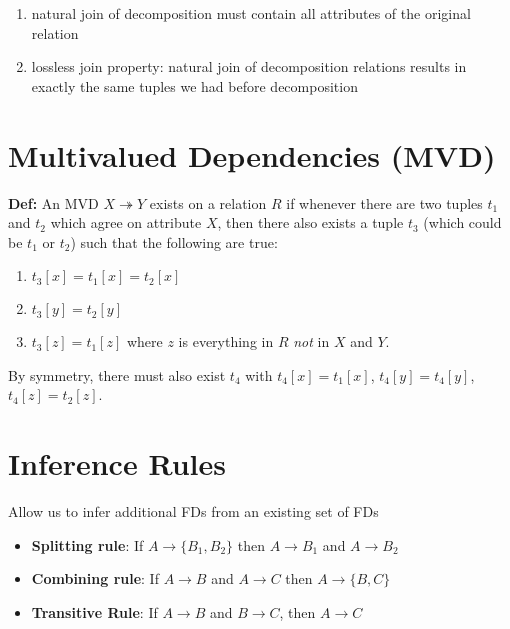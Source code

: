 \documentclass{../cheatsheet}
\begin{document}
\begin{multicols*}{2}
    \begin{enumerate}
        \item natural join of decomposition must contain all attributes of the
            original relation
        \item lossless join property: natural join of decomposition relations
            results in exactly the same tuples we had before decomposition
    \end{enumerate}

    \section{Multivalued Dependencies (MVD)}
    \textbf{Def:} An MVD $X \twoheadrightarrow Y$ exists on a relation $R$ if
    whenever there are two tuples $t_1$ and $t_2$ which agree on attribute $X$, then
    there also exists a tuple $t_3$ (which could be $t_1$ or $t_2$) such that the
    following are true:

    \begin{enumerate}
        \item $t_3[x] = t_1[x] = t_2[x]$
        \item $t_3[y] = t_2[y]$
        \item $t_3[z] = t_1[z]$ where $z$ is everything in $R$ \textit{not} in $X$
            and $Y$.
    \end{enumerate}

    By symmetry, there must also exist $t_4$ with $t_4[x] = t_1[x]$, $t_4[y] =
    t_4[y]$, $t_4[z] = t_2[z]$.

    \section{Inference Rules}
    Allow us to infer additional FDs from an existing set of FDs
    \begin{itemize}
        \item \textbf{Splitting rule}: If $A \rightarrow \{B_1, B_2\}$ then $A
            \rightarrow B_1$ and $A \rightarrow B_2$
        \item \textbf{Combining rule}: If $A \rightarrow B$ and $A \rightarrow
            C$ then $A \rightarrow \{B, C\}$
        \item \textbf{Transitive Rule}: If $A \rightarrow B$ and $B \rightarrow
            C$, then $A \rightarrow C$
    \end{itemize}
\end{multicols*}
\end{document}
